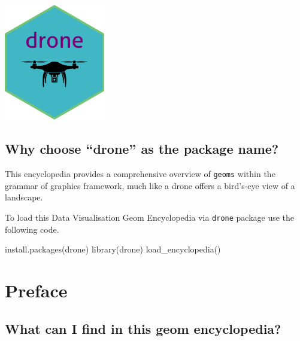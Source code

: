 \documentclass[
  letterpaper,
  DIV=11,
  numbers=noendperiod]{scrreprt}
\newenvironment{Shaded}{\begin{snugshade}}{\end{snugshade}}
\newcommand{\FunctionTok}[1]{\textcolor[rgb]{0.28,0.35,0.67}{#1}}
\newcommand{\NormalTok}[1]{\textcolor[rgb]{0.00,0.23,0.31}{#1}}
\begin{document}

\begin{center}
\includegraphics[width=1.73in,height=\textheight,keepaspectratio]{dronehex.png}
\end{center}

\section*{Why choose ``drone'' as the package
name?}\label{why-choose-drone-as-the-package-name}


This encyclopedia provides a comprehensive overview of \texttt{geoms}
within the grammar of graphics framework, much like a drone offers a
bird's-eye view of a landscape.

To load this {Data Visualisation Geom Encyclopedia} via \texttt{drone}
package use the following code.

\begin{Shaded}
\begin{Highlighting}[]
\FunctionTok{install.packages}\NormalTok{(drone)}
\FunctionTok{library}\NormalTok{(drone)}
\FunctionTok{load\_encyclopedia}\NormalTok{()}
\end{Highlighting}
\end{Shaded}


\chapter*{Preface}\label{preface}


\section*{\texorpdfstring{What can I find in this {geom
encyclopedia}?}{What can I find in this geom encyclopedia?}}\label{what-can-i-find-in-this-geom-encyclopedia}
\end{document}
